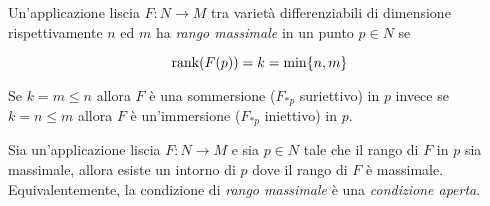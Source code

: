 Un'applicazione liscia $ F : N \to M $ tra varietà differenziabili di dimensione rispettivamente $ n $ ed $ m $ ha \textit{rango massimale} in un punto $ p \in N $ se

\begin{equation}
	\rank(F(p)) = k = \min\{n,m\}
\end{equation}

Se $ k = m \leqslant n $ allora $ F $ è una sommersione ($ F_{*p} $ suriettivo) in $ p $ invece se $ k = n \leqslant m $ allora $ F $ è un'immersione ($ F_{*p} $ iniettivo) in $ p $.

\begin{lemma}
	Sia un'applicazione liscia $ F : N \to M $ e sia $ p \in N $ tale che il rango di $ F $ in $ p $ sia massimale, allora esiste un intorno di $ p $ dove il rango di $ F $ è massimale. Equivalentemente, la condizione di \textit{rango massimale} è una \textit{condizione aperta}.
\end{lemma}

